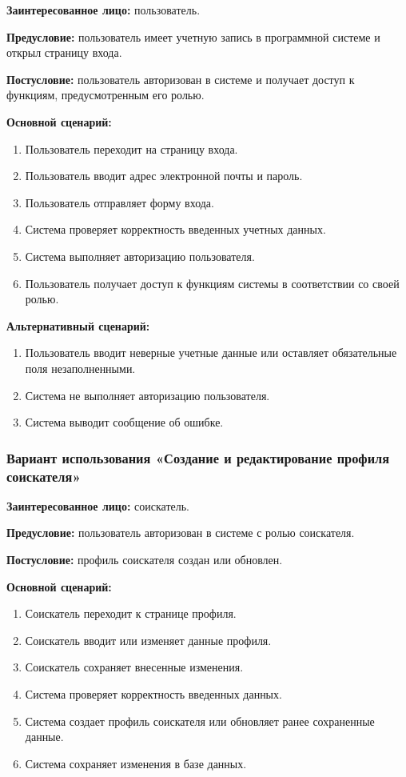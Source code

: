 \textbf{Заинтересованное лицо:} пользователь.

\textbf{Предусловие:} пользователь имеет учетную запись в программной системе и открыл страницу входа.

\textbf{Постусловие:} пользователь авторизован в системе и получает доступ к функциям, предусмотренным его ролью.

\textbf{Основной сценарий:}
\begin{enumerate}
	\item Пользователь переходит на страницу входа.
	\item Пользователь вводит адрес электронной почты и пароль.
	\item Пользователь отправляет форму входа.
	\item Система проверяет корректность введенных учетных данных.
	\item Система выполняет авторизацию пользователя.
	\item Пользователь получает доступ к функциям системы в соответствии со своей ролью.
\end{enumerate}

\textbf{Альтернативный сценарий:}
\begin{enumerate}
	\item Пользователь вводит неверные учетные данные или оставляет обязательные поля незаполненными.
	\item Система не выполняет авторизацию пользователя.
	\item Система выводит сообщение об ошибке.
\end{enumerate}

\subsubsection{Вариант использования «Создание и редактирование профиля соискателя»}

\textbf{Заинтересованное лицо:} соискатель.

\textbf{Предусловие:} пользователь авторизован в системе с ролью соискателя.

\textbf{Постусловие:} профиль соискателя создан или обновлен.

\textbf{Основной сценарий:}
\begin{enumerate}
	\item Соискатель переходит к странице профиля.
	\item Соискатель вводит или изменяет данные профиля.
	\item Соискатель сохраняет внесенные изменения.
	\item Система проверяет корректность введенных данных.
	\item Система создает профиль соискателя или обновляет ранее сохраненные данные.
	\item Система сохраняет изменения в базе данных.
\end{enumerate}

